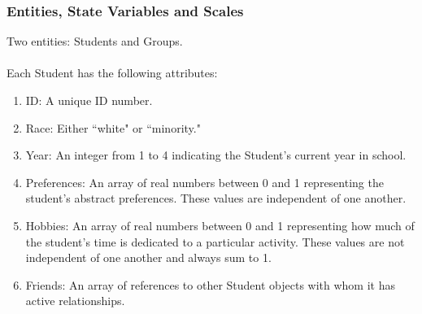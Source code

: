\documentclass{beamer}
\begin{document}
%
%


\begin{frame}
\frametitle{Entities, State Variables and Scales}
Two entities: Students and Groups.\\

~~\\

Each Student has the following attributes:
\begin{enumerate}
\item ID: A unique ID number.
\item Race: Either ``white" or ``minority."
\item Year: An integer from 1 to 4 indicating the Student's current year in school.
\item Preferences: An array of real numbers between 0 and 1 representing the student's abstract preferences. These values are independent of one another.
\item Hobbies: An array of real numbers between 0 and 1 representing how much of the student's time is dedicated to a particular activity. These values are not independent of one another and always sum to 1.
\item Friends: An array of references to other Student objects with whom it has active relationships.
\end{enumerate}
\end{frame}

\end{document}
